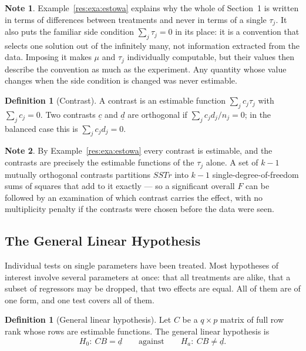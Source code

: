 \documentclass[11pt,a4paper]{article}
\theoremstyle{definition}
\newtheorem{defn}[thm]{Definition}
\newtheorem*{note}{Note}
\begin{document}
\begin{note}
Example~\ref{res:exa:estowa} explains why the whole of Section~1 is written in
terms of differences between treatments and never in terms of a single
$\tau_j$. It also puts the familiar side condition $\sum_j\tau_j=0$ in its
place: it is a convention that selects one solution out of the infinitely
many, not information extracted from the data. Imposing it makes $\mu$ and
$\tau_j$ individually computable, but their values then describe the
convention as much as the experiment. Any quantity whose value changes when
the side condition is changed was never estimable.
\end{note}

\begin{defn}[Contrast]
A contrast is an estimable function $\sum_j c_j\tau_j$ with
$\sum_j c_j=0$. Two contrasts $\underline{c}$ and $\underline{d}$ are
orthogonal if $\sum_j c_jd_j/n_j=0$; in the balanced case this is
$\sum_j c_jd_j=0$.
\end{defn}

\begin{note}
By Example~\ref{res:exa:estowa} every contrast is estimable, and the
contrasts are precisely the estimable functions of the $\tau_j$ alone. A set
of $k-1$ mutually orthogonal contrasts partitions $SSTr$ into $k-1$
single-degree-of-freedom sums of squares that add to it exactly --- so a
significant overall $F$ can be followed by an examination of which contrast
carries the effect, with no multiplicity penalty if the contrasts were chosen
before the data were seen.
\end{note}

\subsection{The General Linear Hypothesis}

Individual tests on single parameters have been treated. Most hypotheses of
interest involve several parameters at once: that all treatments are alike,
that a subset of regressors may be dropped, that two effects are equal. All of
them are of one form, and one test covers all of them.

\begin{defn}[General linear hypothesis]
Let $C$ be a $q\times p$ matrix of full row rank whose rows are estimable
functions. The general linear hypothesis is
$$H_0:\ CB=\underline{d}\qquad\text{against}\qquad H_a:\ CB\neq\underline{d}.$$
\end{defn}
\end{document}
